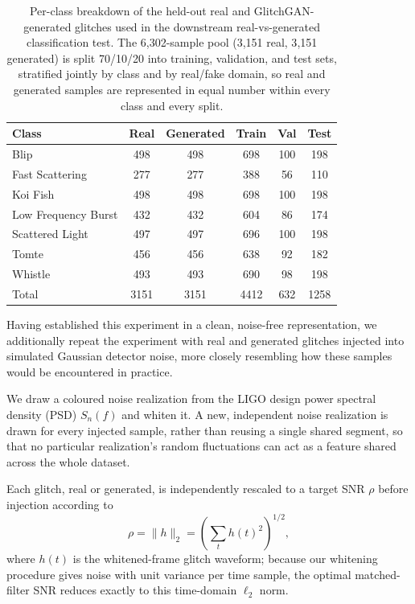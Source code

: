 \documentclass[reprint,nofootinbib,amsmath,amssymb,aps,floatfix]{revtex4-2}
\begin{document}
\begin{table}[h]
\centering
\caption{Per-class breakdown of the held-out real and GlitchGAN-generated glitches used in the downstream real-vs-generated classification test. The 6{,}302-sample pool (3{,}151 real, 3{,}151 generated) is split 70/10/20 into training, validation, and test sets, stratified jointly by class and by real/fake domain, so real and generated samples are represented in equal number within every class and every split.}
\label{tab:clf_split_breakdown}
\begin{tabular}{lccccc}
\toprule
Class & Real & Generated & Train & Val & Test \\
\midrule
Blip                 & 498  & 498  & 698  & 100 & 198  \\
Fast Scattering      & 277  & 277  & 388  & 56  & 110  \\
Koi Fish             & 498  & 498  & 698  & 100 & 198  \\
Low Frequency Burst  & 432  & 432  & 604  & 86  & 174  \\
Scattered Light      & 497  & 497  & 696  & 100 & 198  \\
Tomte                & 456  & 456  & 638  & 92  & 182  \\
Whistle              & 493  & 493  & 690  & 98  & 198  \\
\midrule
Total                & 3151 & 3151 & 4412 & 632 & 1258 \\
\bottomrule
\end{tabular}
\end{table}

Having established this experiment in a clean, noise-free representation, we additionally repeat the experiment with real and generated glitches injected into simulated Gaussian detector noise, more closely resembling how these samples would be encountered in practice.\label{sec:noise_injection_methodology}

We draw a coloured noise realization from the LIGO design power spectral density (PSD) $S_n(f)$ and whiten it. 
A new, independent noise realization is drawn for every injected sample, rather than reusing a single shared segment, so that no particular realization's random fluctuations can act as a feature shared across the whole dataset.


Each glitch, real or generated, is independently rescaled to a target SNR $\rho$ before injection according to
\begin{equation}\label{eq:snr_flat}
    \rho = \lVert h \rVert_2 = \left(\sum_t h(t)^2\right)^{1/2} ,
\end{equation}
where $h(t)$ is the whitened-frame glitch waveform; because our whitening procedure gives noise with unit variance per time sample, the optimal matched-filter SNR reduces exactly to this time-domain $\ell_2$ norm.
\end{document}
